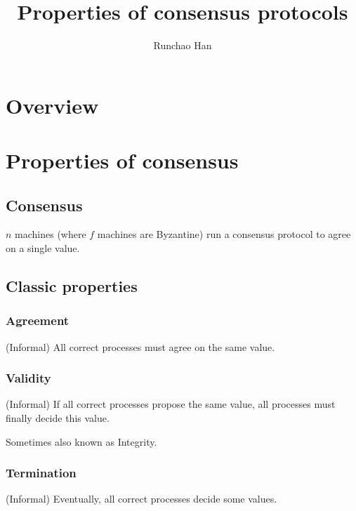 \documentclass[runningheads]{llncs}
\begin{document}
\title{Properties of consensus protocols}

\author{Runchao Han}


\maketitle


\section{Overview}



\section{Properties of consensus}

\subsection{Consensus}
$n$ machines (where $f$ machines are Byzantine) run a consensus protocol to agree on a single value.

\subsection{Classic properties}

\subsubsection{Agreement}
(Informal) All correct processes must agree on the same value.

\subsubsection{Validity}
(Informal) If all correct processes propose the same value, all processes must finally decide this value.

Sometimes also known as Integrity.

\subsubsection{Termination}
(Informal) Eventually, all correct processes decide some values.
\end{document}
